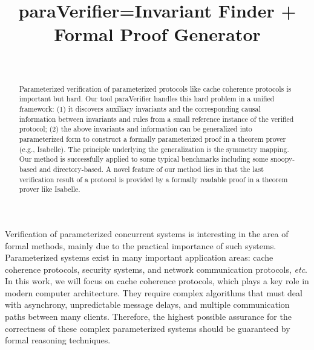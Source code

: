 \documentclass{llncs}
\begin{document}
\title{ {\sf paraVerifier=Invariant Finder + Formal Proof Generator}}
\author{~}
\authorrunning{~}
\institute{~}

\maketitle

\begin{abstract}
Parameterized verification of parameterized protocols like cache coherence protocols is important
but hard.   Our tool {\sf paraVerifier} handles this hard problem in
a unified framework: (1) it  discovers auxiliary invariants and the
corresponding causal information between invariants and rules from a
small reference instance of the verified protocol; (2) the above
invariants and information  can be generalized into parameterized
form to construct a formally parameterized proof in a theorem prover
(e.g., Isabelle). The principle underlying the generalization is the
symmetry mapping. Our method is successfully applied to some typical
benchmarks including some snoopy-based and directory-based. A novel
feature of our method lies in that the last verification result of a
protocol is provided by a formally readable proof in a theorem
prover like Isabelle.

\end{abstract}

Verification of parameterized concurrent systems is interesting in
the area of formal methods, mainly due to the practical importance
of such systems. Parameterized systems exist in many important
application areas: cache coherence protocols, security systems, and
network communication protocols, \emph{etc}. In this work, we will
focus on cache coherence protocols, which plays a key role in modern
computer architecture. They require complex algorithms that must
deal with asynchrony, unpredictable message delays, and multiple
communication paths between many clients. Therefore, the highest
possible assurance for the correctness of these complex
parameterized systems should be guaranteed by formal reasoning
techniques.
\end{document}
